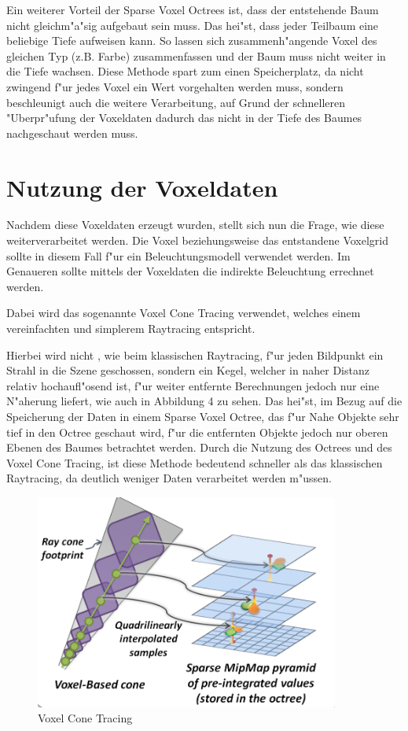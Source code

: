 \documentclass[a4paper, 12pt]{scrartcl}
\begin{document}
Ein weiterer Vorteil der Sparse Voxel Octrees ist, dass der entstehende Baum nicht gleichm"a"sig aufgebaut sein muss. 
Das hei"st, dass jeder Teilbaum eine beliebige Tiefe aufweisen kann.
So lassen sich zusammenh"angende Voxel des gleichen Typ (z.B. Farbe) zusammenfassen und der Baum muss nicht weiter in die Tiefe wachsen.
Diese Methode spart zum einen Speicherplatz, da nicht zwingend f"ur jedes Voxel ein Wert vorgehalten werden muss, sondern beschleunigt auch die weitere Verarbeitung, auf Grund der schnelleren "Uberpr"ufung der Voxeldaten dadurch das nicht in der Tiefe des Baumes nachgeschaut werden muss.

\section{Nutzung der Voxeldaten}
Nachdem diese Voxeldaten erzeugt wurden, stellt sich nun die Frage, wie diese weiterverarbeitet werden.
Die Voxel beziehungsweise das entstandene Voxelgrid sollte in diesem Fall f"ur ein Beleuchtungsmodell verwendet werden. Im Genaueren sollte mittels der Voxeldaten die indirekte Beleuchtung errechnet werden.

Dabei wird das sogenannte Voxel Cone Tracing verwendet, welches einem vereinfachten und simplerem Raytracing entspricht.

Hierbei wird nicht , wie beim klassischen Raytracing, f"ur jeden Bildpunkt ein Strahl in die Szene geschossen, sondern ein Kegel, welcher in naher Distanz relativ hochaufl"osend ist, f"ur weiter entfernte Berechnungen jedoch nur eine N"aherung liefert, wie auch in Abbildung 4 zu sehen.
Das hei"st, im Bezug auf die Speicherung der Daten in einem Sparse Voxel Octree, das f"ur Nahe Objekte sehr tief in den Octree geschaut wird, f"ur die entfernten Objekte jedoch nur oberen Ebenen des Baumes betrachtet werden.
Durch die Nutzung des Octrees und des Voxel Cone Tracing, ist diese Methode bedeutend schneller als das klassischen Raytracing, da deutlich weniger Daten verarbeitet werden m"ussen.

\begin{figure}[h]
	\centering
		\includegraphics[width=10cm]{voxel-cone-tracing}
	\caption{Voxel Cone Tracing}
\end{figure}
\end{document}

